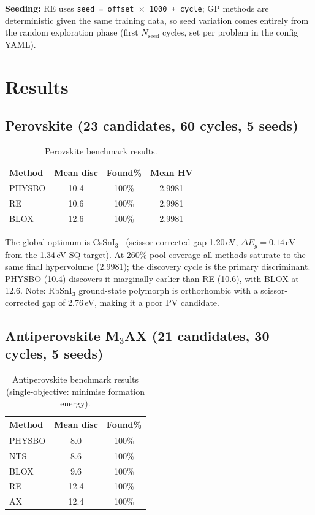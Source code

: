 \documentclass[10pt,twocolumn]{article}
\begin{document}
\textbf{Seeding:} RE uses \texttt{seed = offset $\times$ 1000 + cycle}; GP
methods are deterministic given the same training data, so seed variation
comes entirely from the random exploration phase (first $N_{\text{seed}}$
cycles, set per problem in the config YAML).

\section{Results}

\subsection{Perovskite (23 candidates, 60 cycles, 5 seeds)}

\begin{table}[h]
\centering
\caption{Perovskite benchmark results.}
\label{tab:perovskite}
\begin{tabular}{lccc}
\toprule
Method & Mean disc & Found\% & Mean HV \\
\midrule
PHYSBO & 10.4 & 100\% & 2.9981 \\
RE     & 10.6 & 100\% & 2.9981 \\
BLOX   & 12.6 & 100\% & 2.9981 \\
\bottomrule
\end{tabular}
\end{table}

The global optimum is CsSnI$_3$~\cite{stoumpos} (scissor-corrected gap 1.20\,eV,
$\Delta E_g = 0.14$\,eV from the 1.34\,eV SQ target).
At 260\% pool coverage all methods saturate to the same final hypervolume
(2.9981); the discovery cycle is the primary discriminant.
PHYSBO (10.4) discovers it marginally earlier than RE (10.6), with BLOX at 12.6.
Note: RbSnI$_3$ ground-state polymorph is orthorhombic with a scissor-corrected
gap of 2.76\,eV, making it a poor PV candidate.

\subsection{Antiperovskite M$_3$AX (21 candidates, 30 cycles, 5 seeds)}

\begin{table}[h]
\centering
\caption{Antiperovskite benchmark results (single-objective: minimise formation energy).}
\label{tab:antiperovskite}
\begin{tabular}{lcc}
\toprule
Method & Mean disc & Found\% \\
\midrule
PHYSBO & 8.0  & 100\% \\
NTS    & 8.6  & 100\% \\
BLOX   & 9.6  & 100\% \\
RE     & 12.4 & 100\% \\
AX     & 12.4 & 100\% \\
\bottomrule
\end{tabular}
\end{table}
\end{document}

